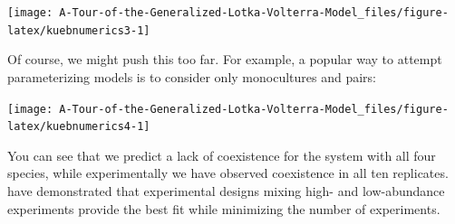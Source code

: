\documentclass[]{book}
\newenvironment{Shaded}{\begin{snugshade}}{\end{snugshade}}
\newcommand{\DataTypeTok}[1]{\textcolor[rgb]{0.13,0.29,0.53}{#1}}
\newcommand{\DecValTok}[1]{\textcolor[rgb]{0.00,0.00,0.81}{#1}}
\newcommand{\KeywordTok}[1]{\textcolor[rgb]{0.13,0.29,0.53}{\textbf{#1}}}
\newcommand{\NormalTok}[1]{#1}
\newcommand{\OperatorTok}[1]{\textcolor[rgb]{0.81,0.36,0.00}{\textbf{#1}}}
\newcommand{\StringTok}[1]{\textcolor[rgb]{0.31,0.60,0.02}{#1}}
\begin{document}
\begin{center}\texttt{[image: A-Tour-of-the-Generalized-Lotka-Volterra-Model\_files/figure-latex/kuebnumerics3-1]} \end{center}

Of course, we might push this too far. For example, a popular way to attempt parameterizing models is to consider only monocultures and pairs:

\begin{Shaded}
\end{Shaded}

\begin{center}\texttt{[image: A-Tour-of-the-Generalized-Lotka-Volterra-Model\_files/figure-latex/kuebnumerics4-1]} \end{center}

You can see that we predict a lack of coexistence for the system with all four species, while experimentally we have observed coexistence in all ten replicates. \citet{maynard2019predicting} have demonstrated that experimental designs mixing high- and low-abundance experiments provide the best fit while minimizing the number of experiments.


\end{document}
